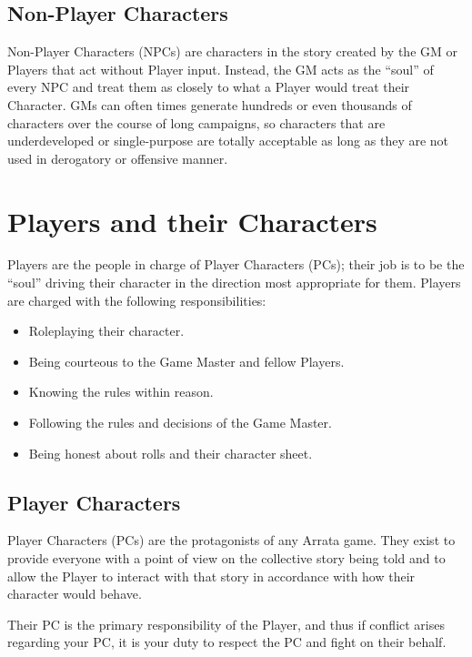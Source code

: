 \documentclass[../main.tex]{subfiles}
\begin{document}
    \subsection{Non-Player Characters}
    Non-Player Characters (NPCs) are characters in the story created by the GM or Players that act without Player input. Instead, the GM acts as the ``soul'' of every NPC and treat them as closely to what a Player would treat their Character. GMs can often times generate hundreds or even thousands of characters over the course of long campaigns, so characters that are underdeveloped or single-purpose are totally acceptable as long as they are not used in derogatory or offensive manner.

    \section{Players and their Characters}

    Players are the people in charge of Player Characters (PCs); their job is to be the ``soul'' driving their character in the direction most appropriate for them. Players are charged with the following responsibilities:

    \begin{itemize}
        \item Roleplaying their character.
        \item Being courteous to the Game Master and fellow Players.
        \item Knowing the rules within reason.
        \item Following the rules and decisions of the Game Master.
        \item Being honest about rolls and their character sheet.
    \end{itemize}

    \subsection{Player Characters}

    Player Characters (PCs) are the protagonists of any Arrata game. They exist to provide everyone with a point of view on the collective story being told and to allow the Player to interact with that story in accordance with how their character would behave. 
    
    Their PC is the primary responsibility of the Player, and thus if conflict arises regarding your PC, it is your duty to respect the PC and fight on their behalf.
\end{document}

